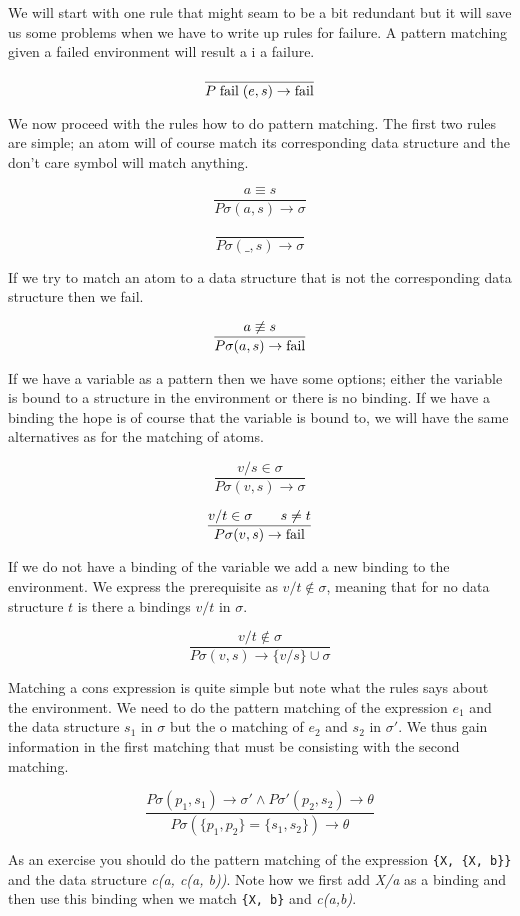\documentclass[a4paper,11pt]{article}
\begin{document}
We will start with one rule that might seam to be a bit redundant but
it will save us some problems when we have to write up rules for
failure. A pattern matching given a failed environment will result a i
a failure.

$$\frac{}{P\;{\rm fail}\;(e, s) \rightarrow {\rm fail}}$$ 

We now proceed with the rules how to do pattern matching. The first
two rules are simple; an atom will of course match its corresponding
data structure and the don't care symbol will match anything.

$$\frac{a \equiv s}{P\sigma(a, s) \rightarrow \sigma}$$ 

$$\frac{}{P\sigma(\_,s) \rightarrow \sigma}$$

If we try to match an atom to a data structure that is not the
corresponding data structure then we fail.

$$\frac{a \not\equiv s}{P\sigma(a, s) \rightarrow {\rm fail}}$$ 

If we have a variable as a pattern then we have some options; either
the variable is bound to a structure in the environment or there is no
binding. If we have a binding the hope is of course that the variable
is bound to, we will have the same alternatives as for the matching of
atoms.

$$\frac{v/s \in \sigma}{P\sigma(v, s) \rightarrow \sigma}$$

$$\frac{v/t \in \sigma  \qquad s \not= t}{P\sigma(v, s) \rightarrow {\rm fail}}$$

If we do not have a binding of the variable we add a new binding to
the environment. We express the prerequisite as $v/t \not\in \sigma$,
meaning that for no data structure $t$ is there a bindings $v/t$ in
$\sigma$.

$$\frac{v/t \not\in \sigma}{P\sigma(v, s) \rightarrow \lbrace v/s \rbrace \cup \sigma}$$ 

Matching a cons expression is quite simple but note what the rules
says about the environment. We need to do the pattern matching of the
expression $e_1$ and the data structure $s_1$ in $\sigma$ but the
o matching of $e_2$ and $s_2$ in $\sigma'$. We thus gain information in
the first matching that must be consisting with the second matching.

$$\frac{P\sigma(p_1, s_1) \rightarrow \sigma' \wedge P\sigma'(p_2, s_2) \rightarrow \theta}{P\sigma(\lbrace p_1, p_2 \rbrace  = \lbrace s_1, s_2 \rbrace) \rightarrow \theta}$$

As an exercise you should do the pattern matching of the expression
{\tt \{X, \{X, b\}\}} and the data structure {\em c(a, c(a, b))}. Note
how we first add {\em X/a} as a binding and then use this binding when
we match {\tt \{X, b\}} and {\em c(a,b)}.
\end{document}
